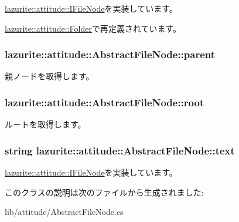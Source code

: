 \hyperlink{interfacelazurite_1_1attitude_1_1_i_file_node_aef59ad71eae714defca2dc6fb7a03435}{lazurite::attitude::IFileNode}を実装しています。

\hyperlink{classlazurite_1_1attitude_1_1_folder_afcfe6dea96b826c40b4b99cf34888b0c}{lazurite::attitude::Folder}で再定義されています。\hypertarget{classlazurite_1_1attitude_1_1_abstract_file_node_a2819f5572d0a5e33cdfc4f50ee0e8d8f}{
\subsubsection[{parent}]{ lazurite::attitude::AbstractFileNode::parent}}
\label{classlazurite_1_1attitude_1_1_abstract_file_node_a2819f5572d0a5e33cdfc4f50ee0e8d8f}
親ノードを取得します。 \hypertarget{classlazurite_1_1attitude_1_1_abstract_file_node_aef503a4b7e10d0608b7d9143a0304b42}{
\subsubsection[{root}]{ lazurite::attitude::AbstractFileNode::root}}
\label{classlazurite_1_1attitude_1_1_abstract_file_node_aef503a4b7e10d0608b7d9143a0304b42}
ルートを取得します。 \hypertarget{classlazurite_1_1attitude_1_1_abstract_file_node_aa117dae2818bab77b5215d6307c99aeb}{
\subsubsection[{text}]{\setlength{\rightskip}{0pt plus 5cm}string lazurite::attitude::AbstractFileNode::text}}
\label{classlazurite_1_1attitude_1_1_abstract_file_node_aa117dae2818bab77b5215d6307c99aeb}


\hyperlink{interfacelazurite_1_1attitude_1_1_i_file_node_a7ac4b8574f1527248a33d0e816e080cf}{lazurite::attitude::IFileNode}を実装しています。

このクラスの説明は次のファイルから生成されました:\begin{DoxyCompactItemize}
\item 
lib/attitude/AbstractFileNode.cs\end{DoxyCompactItemize}
